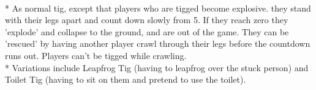 \begin{minipage}{\textwidth}
\\*
As normal tig, except that players who are tigged become explosive.  they stand with their legs apart and count down slowly from 5.  If they reach zero they 'explode' and collapse to the ground, and are out of the game.  They can be 'rescued' by having another player crawl through their legs before the countdown runs out.  Players can't be tigged while crawling.\\*
Variations include Leapfrog Tig (having to leapfrog over the stuck person) and Toilet Tig (having to sit on them and pretend to use the toilet).
\end{minipage}    \vfill
